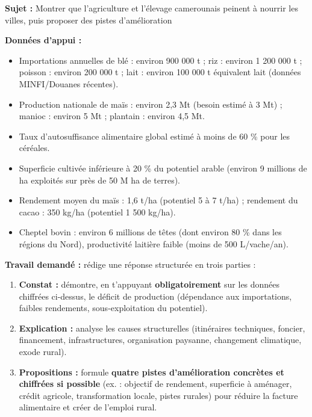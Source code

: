 \documentclass[11pt]{article}
\begin{document}
\begin{exercice}
\textbf{Sujet :} \og Montrer que l'agriculture et l'élevage camerounais peinent à nourrir les villes, puis proposer des pistes d'amélioration \fg

\textbf{Données d'appui :}
\begin{itemize}
\item Importations annuelles de blé : environ 900 000 t ; riz : environ 1 200 000 t ; poisson : environ 200 000 t ; lait : environ 100 000 t équivalent lait (données MINFI/Douanes récentes).
\item Production nationale de maïs : environ 2,3 Mt (besoin estimé à 3 Mt) ; manioc : environ 5 Mt ; plantain : environ 4,5 Mt.
\item Taux d'autosuffisance alimentaire global estimé à moins de 60 \% pour les céréales.
\item Superficie cultivée inférieure à 20 \% du potentiel arable (environ 9 millions de ha exploités sur près de 50 M ha de terres).
\item Rendement moyen du maïs : 1,6 t/ha (potentiel 5 à 7 t/ha) ; rendement du cacao : 350 kg/ha (potentiel 1 500 kg/ha).
\item Cheptel bovin : environ 6 millions de têtes (dont environ 80 \% dans les régions du Nord), productivité laitière faible (moins de 500 L/vache/an).
\end{itemize}

\textbf{Travail demandé :} rédige une réponse structurée en trois parties :
\begin{enumerate}
\item \textbf{Constat :} démontre, en t'appuyant \textbf{obligatoirement} sur les données chiffrées ci-dessus, le déficit de production (dépendance aux importations, faibles rendements, sous-exploitation du potentiel).
\item \textbf{Explication :} analyse les causes structurelles (itinéraires techniques, foncier, financement, infrastructures, organisation paysanne, changement climatique, exode rural).
\item \textbf{Propositions :} formule \textbf{quatre pistes d'amélioration concrètes et chiffrées si possible} (ex. : objectif de rendement, superficie à aménager, crédit agricole, transformation locale, pistes rurales) pour réduire la facture alimentaire et créer de l'emploi rural.
\end{enumerate}
\end{exercice}
\end{document}
